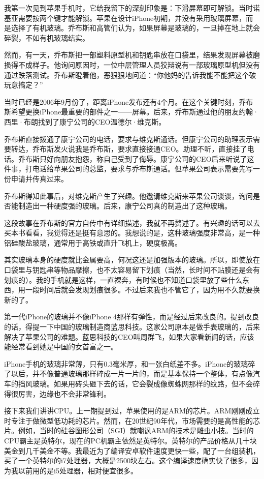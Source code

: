 \documentclass[
  letterpaper,
  DIV=11,
  numbers=noendperiod]{scrreprt}
\begin{document}
我第一次见到苹果手机时，它给我留下的深刻印象是：下滑屏幕即可解锁。当时诺基亚需要按两个键才能解锁。苹果在设计iPhone初期，并没有采用玻璃屏幕，而是选择了有机玻璃。乔布斯和高管们认为，如果屏幕是玻璃的，一旦掉在地上就会碎裂，不如有机玻璃结实。

然而，有一天，乔布斯把一部塑料原型机和钥匙串放在口袋里，结果发现屏幕被磨损得不成样子。他询问原因时，一位中层管理人员狡辩说有一部玻璃原型机但没有通过跌落测试。乔布斯瞪着他，恶狠狠地问道：``你他妈的告诉我能不能把这个破玩意搞定？''

当时已经是2006年9月份了，距离iPhone发布还有4个月。在这个关键时刻，乔布斯希望更换iPhone最重要的部件之一------屏幕。后来，乔布斯通过他的朋友约翰·西里·布朗找到了康宁公司的CEO温德尔·维克斯。

乔布斯直接拨通了康宁公司的电话，要求与维克斯通话。但康宁公司的助理表示需要转达，乔布斯发火说我是乔布斯，要求直接接通CEO。助理不听，直接挂了电话。乔布斯只好向朋友抱怨，称自己受到了侮辱。康宁公司的CEO后来听说了这件事，打电话给苹果公司的总监，要求与乔布斯通话。但苹果公司表示需要先写一份申请并传真过来。

乔布斯得知此事后，对维克斯产生了兴趣。他邀请维克斯来苹果公司谈谈，询问是否能制造出一种硬度强的玻璃。后来，康宁公司真的制造出了这种玻璃。

这段故事在乔布斯的官方自传中有详细描述，我就不再赘述了。有兴趣的话可以去买本书看看，我觉得还是挺有意思的。我想说的是，这种玻璃强度非常高，是一种铝硅酸盐玻璃，通常用于高铁或直升飞机上，硬度极高。

其实玻璃本身的硬度就比金属要高，何况这还是加强版本的玻璃。所以，即使放在口袋里与钥匙串等物品摩擦，也不太容易留下划痕（当然，长时间不贴膜还是会有划痕的）。我的手机就是这样，一直裸奔，有时候也不知道口袋里放了些什么东西，用一段时间后就会发现划痕很多。不过后来我也不管它了，因为用不久就要换新的了。

第一代iPhone的玻璃并不像iPhone
4那样有弹性，而是经过后来改良的。提到改良的话，得提一下中国的玻璃制造商蓝思科技。这家公司原本是做手表玻璃的，后来解决了苹果公司的难题。蓝思科技的CEO叫周群飞，如果大家看新闻的话，应该能经常看到她是中国的女首富之一。

iPhone手机的玻璃非常薄，只有0.3毫米厚，和一张白纸差不多。iPhone的玻璃碎了以后，并不像普通玻璃那样碎成一片一片的，而是基本保持一个整体，有点像汽车的挡风玻璃。如果用砖头砸下去的话，它会裂成像蜘蛛网那样的纹路，但不会碎得很厉害，边缘也不会非常锋利。

接下来我们讲讲CPU。上一期提到过，苹果使用的是ARM的芯片。ARM刚刚成立时专注于做微型低功耗的芯片。然而，在20世纪90年代，市场需要的是高性能的芯片。例如，当时的硅谷图形公司（SGI）就嘲讽ARM的技术是雕虫小技。当时的CPU霸主是英特尔，现在的PC机霸主依然是英特尔。英特尔的产品价格从几十块美金到几千美金不等。我最近为了编译安卓软件速度更快一些，配了一台组装机，买了一个英特尔的i7处理器，大概是2500块左右。这个编译速度确实快了很多，因为我以前用的是i5处理器，相对便宜很多。
\end{document}
